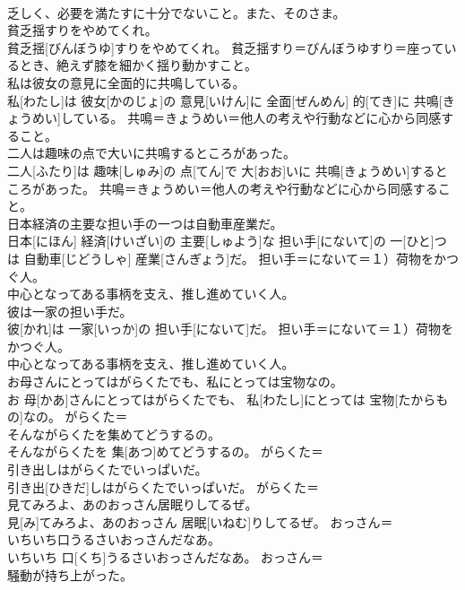 \documentclass[8pt]{extreport}
\begin{document}
\begin{CJK}{UTF8}{min}
{\\	乏しく、必要を満たすに十分でないこと。また、そのさま。
\\	貧乏揺すりをやめてくれ。	
\\	貧乏揺[びんぼうゆ]すりをやめてくれ。	貧乏揺すり＝びんぼうゆすり＝座っているとき、絶えず膝を細かく揺り動かすこと。
\\	私は彼女の意見に全面的に共鳴している。	
\\	私[わたし]は 彼女[かのじょ]の 意見[いけん]に 全面[ぜんめん] 的[てき]に 共鳴[きょうめい]している。	共鳴＝きょうめい＝他人の考えや行動などに心から同感すること。
\\	二人は趣味の点で大いに共鳴するところがあった。	
\\	二人[ふたり]は 趣味[しゅみ]の 点[てん]で 大[おお]いに 共鳴[きょうめい]するところがあった。	共鳴＝きょうめい＝他人の考えや行動などに心から同感すること。
\\	日本経済の主要な担い手の一つは自動車産業だ。	
\\	日本[にほん] 経済[けいざい]の 主要[しゅよう]な 担い手[にないて]の 一[ひと]つは 自動車[じどうしゃ] 産業[さんぎょう]だ。	担い手＝にないて＝１）荷物をかつぐ人。 　　　　　　　　　
\\	中心となってある事柄を支え、推し進めていく人。
\\	彼は一家の担い手だ。	
\\	彼[かれ]は 一家[いっか]の 担い手[にないて]だ。	担い手＝にないて＝１）荷物をかつぐ人。 　　　　　　　　　
\\	中心となってある事柄を支え、推し進めていく人。
\\	お母さんにとってはがらくたでも、私にとっては宝物なの。	
\\	お 母[かあ]さんにとってはがらくたでも、 私[わたし]にとっては 宝物[たからもの]なの。	がらくた＝ 
\\	そんながらくたを集めてどうするの。	
\\	そんながらくたを 集[あつ]めてどうするの。	がらくた＝ 
\\	引き出しはがらくたでいっぱいだ。	
\\	引き出[ひきだ]しはがらくたでいっぱいだ。	がらくた＝ 
\\	見てみろよ、あのおっさん居眠りしてるぜ。	
\\	見[み]てみろよ、あのおっさん 居眠[いねむ]りしてるぜ。	おっさん＝ 
\\	いちいち口うるさいおっさんだなあ。	
\\	いちいち 口[くち]うるさいおっさんだなあ。	おっさん＝ 
\\	騒動が持ち上がった。	
}
\end{CJK}
\end{document}

